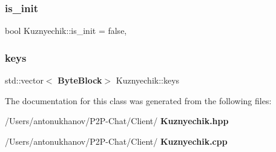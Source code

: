 \subsubsection{is\+\_\+init}
{\footnotesize\ttfamily bool Kuznyechik\+::is\+\_\+init = false\hspace{0.3cm}{\ttfamily [static]}, {\ttfamily [private]}}

\mbox{\label{class_kuznyechik_a19e910dc6d7358b07ab733c31ae52b8d}} 
\subsubsection{keys}
{\footnotesize\ttfamily std\+::vector$<$\textbf{ Byte\+Block}$>$ Kuznyechik\+::keys\hspace{0.3cm}{\ttfamily [private]}}



The documentation for this class was generated from the following files\+:\begin{DoxyCompactItemize}
\item 
/\+Users/antonukhanov/\+P2\+P-\/\+Chat/\+Client/\textbf{ Kuznyechik.\+hpp}\item 
/\+Users/antonukhanov/\+P2\+P-\/\+Chat/\+Client/\textbf{ Kuznyechik.\+cpp}\end{DoxyCompactItemize}
